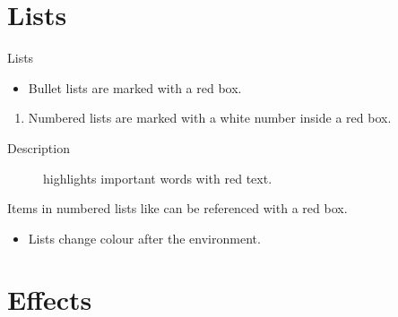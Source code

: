 \documentclass[UKenglish]{beamer}
\begin{document}
\section{Lists}


\begin{frame}{Lists}
    \begin{itemize}
        \item
        Bullet lists are marked with a red box.
    \end{itemize}

    \begin{enumerate}
        \item
        \label{enum:item}
        Numbered lists are marked with a white number inside a red box.
    \end{enumerate}

    \begin{description}
        \item[Description] highlights important words with red text.
    \end{description}

    Items in numbered lists like  can be referenced with a red box.

    \begin{example}
        \begin{itemize}
            \item
            Lists change colour after the environment.
        \end{itemize}
    \end{example}
\end{frame}


\section{Effects}
\end{document}
